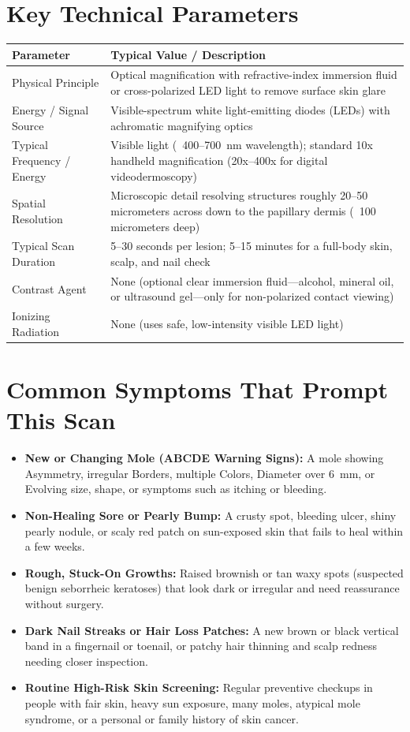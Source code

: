 \section{Key Technical Parameters}
\noindent
\begin{tabularx}{\textwidth}{@{}l X@{}}
\toprule
\textbf{Parameter} & \textbf{Typical Value / Description} \\
\midrule
Physical Principle & Optical magnification with refractive-index immersion fluid or cross-polarized LED light to remove surface skin glare \\
Energy / Signal Source & Visible-spectrum white light-emitting diodes (LEDs) with achromatic magnifying optics \\
Typical Frequency / Energy & Visible light (~400--700~nm wavelength); standard 10x handheld magnification (20x--400x for digital videodermoscopy) \\
Spatial Resolution & Microscopic detail resolving structures roughly 20--50 micrometers across down to the papillary dermis (~100 micrometers deep) \\
Typical Scan Duration & 5--30 seconds per lesion; 5--15 minutes for a full-body skin, scalp, and nail check \\
Contrast Agent & None (optional clear immersion fluid---alcohol, mineral oil, or ultrasound gel---only for non-polarized contact viewing) \\
Ionizing Radiation & None (uses safe, low-intensity visible LED light) \\
\bottomrule
\end{tabularx}

\section{Common Symptoms That Prompt This Scan}
\begin{itemize}
\item \textbf{New or Changing Mole (ABCDE Warning Signs):} A mole showing Asymmetry, irregular Borders, multiple Colors, Diameter over 6~mm, or Evolving size, shape, or symptoms such as itching or bleeding.
\item \textbf{Non-Healing Sore or Pearly Bump:} A crusty spot, bleeding ulcer, shiny pearly nodule, or scaly red patch on sun-exposed skin that fails to heal within a few weeks.
\item \textbf{Rough, Stuck-On Growths:} Raised brownish or tan waxy spots (suspected benign seborrheic keratoses) that look dark or irregular and need reassurance without surgery.
\item \textbf{Dark Nail Streaks or Hair Loss Patches:} A new brown or black vertical band in a fingernail or toenail, or patchy hair thinning and scalp redness needing closer inspection.
\item \textbf{Routine High-Risk Skin Screening:} Regular preventive checkups in people with fair skin, heavy sun exposure, many moles, atypical mole syndrome, or a personal or family history of skin cancer.
\end{itemize}

